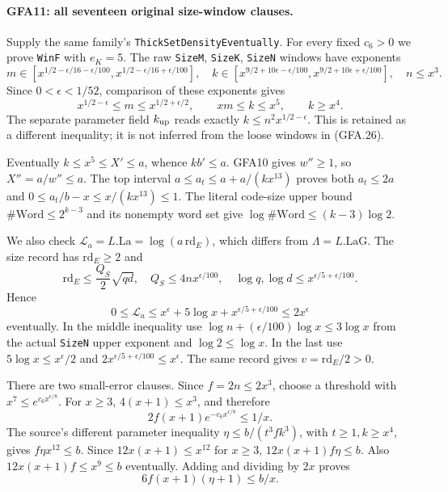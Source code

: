 \paragraph{GFA11: all seventeen original size-window clauses.}
\label{claim:GFA11}
Supply the same family's \texttt{ThickSetDensityEventually}.
For every fixed $c_6>0$ we prove \texttt{WinF} with $e_K=5$.
The raw \texttt{SizeM}, \texttt{SizeK}, \texttt{SizeN}
windows have exponents
\[
 m\in[x^{1/2-\epsilon/16-\epsilon/100},
       x^{1/2-\epsilon/16+\epsilon/100}],\quad
 k\in[x^{9/2+10\epsilon-\epsilon/100},
       x^{9/2+10\epsilon+\epsilon/100}],\quad n\le x^3.
\]
Since $0<\epsilon<1/52$, comparison of these exponents gives
\[
 x^{1/2-\epsilon}\le m\le x^{1/2+\epsilon/2},\qquad
 xm\le k\le x^5,
 \qquad k\ge x^4.                                         \tag{GFA.26}
\]
The separate parameter field $k_{\rm up}$ reads exactly
$k\le n^2x^{1/2-\epsilon}$.  This is retained as a different
inequality; it is not inferred from the loose windows in
(GFA.26).

Eventually $k\le x^5\le X'\le a$, whence $kb'\le a$.
GFA10 gives $w''\ge1$, so $X''=a/w''\le a$.
The top interval
$a\le a_t\le a+a/(kx^{13})$ proves both
$a_t\le2a$ and
$0\le a_t/b-x\le x/(kx^{13})\le1$.
The literal code-size upper bound
$\#\mathrm{Word}\le2^{k-3}$ and its nonempty word set give
$\log\#\mathrm{Word}\le(k-3)\log2$.

We also check $\mathcal L_a=L.\mathrm{La}=\log(a\,\mathrm{rd}_E)$,
which differs from $\Lambda=L.\mathrm{LaG}$.
The size record has $\mathrm{rd}_E\ge2$ and
\[
 \mathrm{rd}_E\le\frac{Q_S}{2}\sqrt{qd},\quad
 Q_S\le4n x^{\epsilon/100},\quad
 \log q,\log d\le x^{\epsilon/5+\epsilon/100}.
\]
Hence
\[
 0\le\mathcal L_a
 \le x^\epsilon+5\log x+x^{\epsilon/5+\epsilon/100}
 \le2x^\epsilon                                              \tag{GFA.27}
\]
eventually.  In the middle inequality use
$\log n+(\epsilon/100)\log x\le3\log x$ from the actual
\texttt{SizeN} upper exponent and $\log2\le\log x$.
In the last use $5\log x\le x^\epsilon/2$ and
$2x^{\epsilon/5+\epsilon/100}\le x^\epsilon$.
The same record gives $v=\mathrm{rd}_E/2>0$.

There are two small-error clauses.  Since $f=2n\le2x^3$,
choose a threshold with $x^7\le e^{c_6x^{\epsilon/8}}$.
For $x\ge3$, $4(x+1)\le x^3$, and therefore
\[
 2f(x+1)e^{-c_6x^{\epsilon/8}}\le1/x.                       \tag{GFA.28}
\]
The source's different parameter inequality
$\eta\le b/(t^3fk^3)$, with $t\ge1,k\ge x^4$, gives
$f\eta x^{12}\le b$.  Since
$12x(x+1)\le x^{12}$ for $x\ge3$,
$12x(x+1)f\eta\le b$.
Also $12x(x+1)f\le x^9\le b$ eventually.
Adding and dividing by $2x$ proves
\[
 6f(x+1)(\eta+1)\le b/x.                                  \tag{GFA.29}
\]

